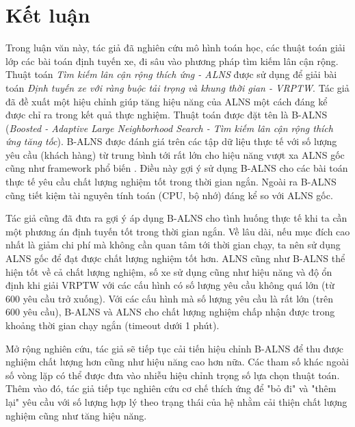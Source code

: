 \chapter{Kết luận}
\label{chap:conclusion}

Trong luận văn này, tác giả đã nghiên cứu mô hình toán học, các thuật toán giải lớp các bài toán định tuyến xe, đi sâu vào phương pháp tìm kiếm lân cận rộng. Thuật toán \textit{Tìm kiếm lân cận rộng thích ứng - ALNS} được sử dụng để giải bài toán \textit{Định tuyến xe với ràng buộc tải trọng và khung thời gian - VRPTW}. Tác giả đã đề xuất một hiệu chỉnh giúp tăng hiệu năng của ALNS một cách đáng kể được chỉ ra trong kết quả thực nghiệm. Thuật toán được đặt tên là B-ALNS (\textit{Boosted - Adaptive Large Neighborhood Search - Tìm kiếm lân cận rộng thích ứng tăng tốc}). B-ALNS được đánh giá trên các tập dữ liệu thực tế với số lượng yêu cầu (khách hàng) từ trung bình tới rất lớn cho hiệu năng vượt xa ALNS gốc cũng như framework phổ biến . Điều này gợi ý sử dụng B-ALNS cho các bài toán thực tế yêu cầu chất lượng nghiệm tốt trong thời gian ngắn. Ngoài ra B-ALNS cũng tiết kiệm tài nguyên tính toán (CPU, bộ nhớ) đáng kể so với ALNS gốc.

Tác giả cũng đã đưa ra gợi ý áp dụng B-ALNS cho tình huống thực tế khi ta cần một phương án định tuyến tốt trong thời gian ngắn. Về lâu dài, nếu mục đích cao nhất là giảm chi phí mà không cần quan tâm tới thời gian chạy, ta nên sử dụng ALNS gốc để đạt được chất lượng nghiệm tốt hơn. ALNS cũng như B-ALNS thể hiện tốt về cả chất lượng nghiệm, số xe sử dụng cũng như hiệu năng và độ ổn định khi giải VRPTW với các cấu hình có số lượng yêu cầu không quá lớn (từ $600$ yêu cầu trở xuống). Với các cấu hình mà số lượng yêu cầu là rất lớn (trên $600$ yêu cầu), B-ALNS và ALNS cho chất lượng nghiệm chấp nhận được trong khoảng thời gian chạy ngắn (timeout dưới 1 phút).

Mở rộng nghiên cứu, tác giả sẽ tiếp tục cải tiến hiệu chỉnh B-ALNS để thu được nghiệm chất lượng hơn cũng như hiệu năng cao hơn nữa. Các tham số khác ngoài số vòng lặp có thể được đưa vào nhiễu hiệu chỉnh trọng số lựa chọn thuật toán. Thêm vào đó, tác giả tiếp tục nghiên cứu cơ chế thích ứng để "bỏ đi" và "thêm lại" yêu cầu với số lượng hợp lý theo trạng thái của hệ nhằm cải thiện chất lượng nghiệm cũng như tăng hiệu năng.

